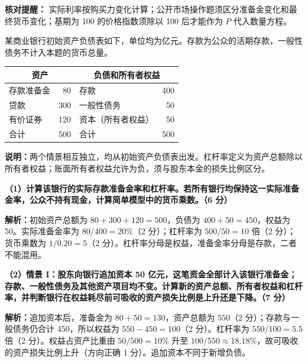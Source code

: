 \documentclass[UTF8,11pt,a4paper,fontset=fandol]{ctexart}
\newcommand{\sect}[1]{\par\vspace{0.7em}{\large\bfseries #1}\par\vspace{0.6em}}
\newcommand{\ans}[1]{\par\textbf{解析：}#1\par}
\begin{document}
\medskip\textbf{核对提醒：}
实际利率按购买力变化计算；公开市场操作题须区分准备金变化和最终货币变化；基期为 100 的价格指数须除以 100 后才能作为 $P$ 代入数量方程。
\newpage\sect{三、计算题（20 分）}
某商业银行初始资产负债表如下，单位均为亿元。存款为公众的活期存款，一般性债务不计入本题的货币总量。
\begin{center}\renewcommand{\arraystretch}{1.35}
\begin{tabularx}{0.9\linewidth}{|X|r|X|r|}\hline
\multicolumn{2}{|c|}{资产}&\multicolumn{2}{c|}{负债和所有者权益}\\\hline
存款准备金&80&存款&400\\\hline
贷款&300&一般性债务&50\\\hline
有价证券&120&资本（所有者权益）&50\\\hline
合计&500&合计&500\\\hline
\end{tabularx}\end{center}

\textbf{说明：}两个情景相互独立，均从初始资产负债表出发。杠杆率定义为资产总额除以所有者权益；账面所有者权益允许为负，须与股东本金的损失比例区分。

\textbf{（1）计算该银行的实际存款准备金率和杠杆率。若所有银行均保持这一实际准备金率，公众不持有现金，计算简单模型中的货币乘数。（6 分）}
\ans{初始资产总额为 $80+300+120=500$，负债为 $400+50=450$，权益为 50。实际准备金率为 $80/400=20\%$（2 分）；杠杆率为 $500/50=10$ 倍（2 分）；货币乘数为 $1/0.20=5$（2 分）。杠杆率分母是权益，准备金率分母是存款，二者不能混用。}

\textbf{（2）情景 I：股东向银行追加资本 50 亿元，这笔资金全部计入该银行准备金；存款、一般性债务及其他资产项目均不变。计算新的资产总额、所有者权益和杠杆率，并判断银行在权益耗尽前可吸收的资产损失比例是上升还是下降。（7 分）}
\ans{追加资本后，准备金为 $80+50=130$，资产总额为 $550$（2 分）；存款与一般债务仍合计 450，所以权益为 $550-450=100$（2 分）。杠杆率为 $550/100=5.5$ 倍（2 分）。权益占资产比重由 $50/500=10\%$ 升至 $100/550\approx18.18\%$，故可吸收的资产损失比例上升（方向正确 1 分）。追加资本不同于新增负债。}
\end{document}
